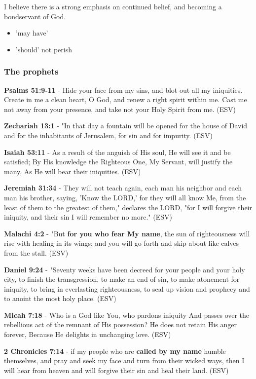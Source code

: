 \documentclass[11pt]{article}
\begin{document}
I believe there is a strong emphasis on continued belief, and becoming a bondservant of God.
\begin{itemize}
\item 'may have'
\item 'should' not perish
\end{itemize}

\subsubsection{The prophets}
\label{sec:org1c24586}
\textbf{Psalms 51:9-11} - Hide your face from my sins, and blot out all my iniquities. Create in me a clean heart, O God, and renew a right spirit within me. Cast me not away from your presence, and take not your Holy Spirit from me. (ESV)

\textbf{Zechariah 13:1} - "In that day a fountain will be opened for the house of David and for the inhabitants of Jerusalem, for sin and for impurity. (ESV)

\textbf{Isaiah 53:11} - As a result of the anguish of His soul, He will see it and be satisfied; By His knowledge the Righteous One, My Servant, will justify the many, As He will bear their iniquities. (ESV)

\textbf{Jeremiah 31:34} - They will not teach again, each man his neighbor and each man his brother, saying, 'Know the LORD,' for they will all know Me, from the least of them to the greatest of them," declares the LORD, "for I will forgive their iniquity, and their sin I will remember no more." (ESV)

\textbf{Malachi 4:2} - "But \textbf{for you who fear My name}, the sun of righteousness will rise with healing in its wings; and you will go forth and skip about like calves from the stall. (ESV)

\textbf{Daniel 9:24} - "Seventy weeks have been decreed for your people and your holy city, to finish the transgression, to make an end of sin, to make atonement for iniquity, to bring in everlasting righteousness, to seal up vision and prophecy and to anoint the most holy place. (ESV)

\textbf{Micah 7:18} - Who is a God like You, who pardons iniquity And passes over the rebellious act of the remnant of His possession? He does not retain His anger forever, Because He delights in unchanging love. (ESV)

\textbf{2 Chronicles 7:14} - if my people who are \textbf{called by my name} humble themselves, and pray and seek my face and turn from their wicked ways, then I will hear from heaven and will forgive their sin and heal their land. (ESV)
\end{document}
